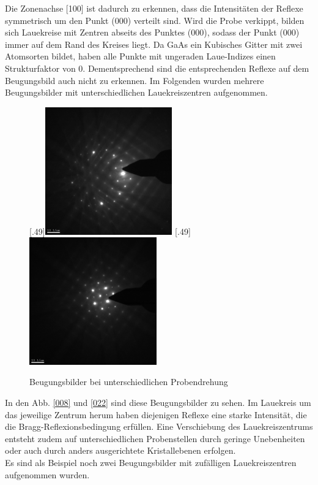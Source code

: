 \documentclass[a4paper,11pt,DIV=11]{scrartcl}
\begin{document}
Die Zonenachse [100] ist dadurch zu erkennen, dass die Intensitäten der Reflexe symmetrisch um den Punkt (000) verteilt sind. Wird die Probe verkippt, bilden sich Lauekreise mit Zentren abseits des Punktes (000), sodass der Punkt (000) immer auf dem Rand des Kreises liegt. Da GaAs ein Kubisches Gitter mit zwei Atomsorten bildet, haben alle Punkte mit ungeraden Laue-Indizes einen Strukturfaktor von 0. Dementsprechend sind die entsprechenden Reflexe auf dem Beugungsbild auch nicht zu erkennen.
Im Folgenden wurden mehrere Beugungsbilder mit unterschiedlichen Lauekreiszentren aufgenommen.

\begin{figure}[htb]\centering
	[.49\linewidth]{\includegraphics[width=0.49\textwidth]{Versuchsdaten/9/008.jpg}}
	[.49\linewidth]{\includegraphics[width=0.49\textwidth]{Versuchsdaten/9/022.jpg}}\\
	\caption{Beugungsbilder bei unterschiedlichen Probendrehung} \label{laue1}
\end{figure}

In den Abb. \ref{008} und \ref{022} sind diese Beugungsbilder zu sehen. Im Lauekreis um das jeweilige Zentrum herum haben diejenigen Reflexe eine starke Intensität, die die Bragg-Reflexionsbedingung erfüllen. Eine Verschiebung des Lauekreiszentrums entsteht zudem auf unterschiedlichen Probenstellen durch geringe Unebenheiten oder auch durch anders ausgerichtete Kristallebenen erfolgen. \\
Es sind als Beispiel noch zwei Beugungsbilder mit zufälligen Lauekreiszentren aufgenommen wurden.
\end{document}
